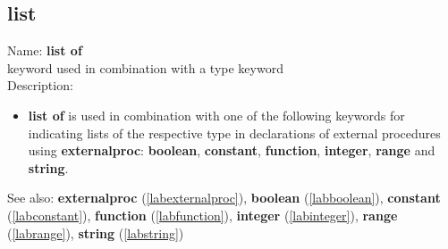 \subsection{list}
\label{lablistof}
\noindent Name: \textbf{list of}\\
keyword used in combination with a type keyword\\
\noindent Description: \begin{itemize}

\item \textbf{list of} is used in combination with one of the following keywords for
   indicating lists of the respective type in declarations of external
   procedures using \textbf{externalproc}: \textbf{boolean}, \textbf{constant}, \textbf{function},
   \textbf{integer}, \textbf{range} and \textbf{string}.
\end{itemize}
See also: \textbf{externalproc} (\ref{labexternalproc}), \textbf{boolean} (\ref{labboolean}), \textbf{constant} (\ref{labconstant}), \textbf{function} (\ref{labfunction}), \textbf{integer} (\ref{labinteger}), \textbf{range} (\ref{labrange}), \textbf{string} (\ref{labstring})
